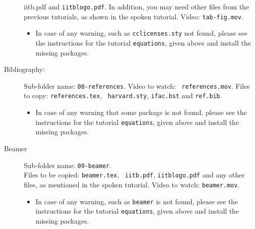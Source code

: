 \documentclass[11pt]{article}
\begin{document}
\begin{multicols}{2}
\begin{description}
{  iitb.pdf} and {\tt iitblogo.pdf}.  In addition, you may need other
files from the previous tutorials, as shown in the spoken tutorial.
Video: {\tt tab-fig.mov}.
\begin{itemize}
\item In case of any warning, such as {\tt cclicenses.sty} not found,
  please see the instructions for the tutorial {\tt equations}, given
  above and install the missing packages.
\end{itemize}
\item [Bibliography:] 
Sub-folder name: {\tt 08-references}.  Video to watch: {\tt
  references.mov}.  
Files to copy: {\tt references.tex}, {\tt
  harvard.sty}, {\tt ifac.bst} and {\tt ref.bib}.
\begin{itemize}
\item In case of any warning that some package is not found,
  please see the instructions for the tutorial {\tt equations}, given
  above and install the missing packages.
\end{itemize}
\item [Beamer]
Sub-folder name: {\tt 09-beamer}. \\
Files to be copied: {\tt beamer.tex}, {\tt
  iitb.pdf}, {\tt iitblogo.pdf} and any other files, as mentioned in
the spoken tutorial.  Video to watch: {\tt beamer.mov}.
\begin{itemize}
\item In case of any warning, such as {\tt beamer} is not found,
  please see the instructions for the tutorial {\tt equations}, given
  above and install the missing packages.
\end{itemize}
\end{description}
\end{multicols}
\end{document}
